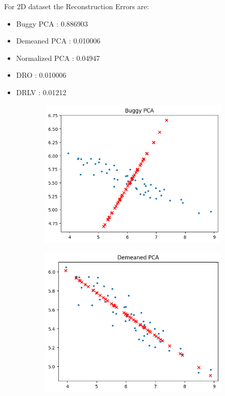 \begin{soln}

    For 2D dataset the Reconstruction Errors are:
    \begin{itemize}
        \item Buggy PCA : 0.886903
        \item Demeaned PCA : 0.010006
        \item Normalized PCA : 0.04947
        \item DRO : 0.010006
        \item DRLV : 0.01212
    \end{itemize}

    \begin{figure}[H]
        \begin{subfigure}{0.5\textwidth}
            \centering
            \includegraphics[scale=0.35]{Images/q24/q24_bugpca.png}
        \end{subfigure}%
        \begin{subfigure}{0.5\textwidth}
            \centering
            \includegraphics[scale=0.35]{Images/q24/q24_demeanpca.png}

\end{subfigure}
\end{figure}
\end{soln}
